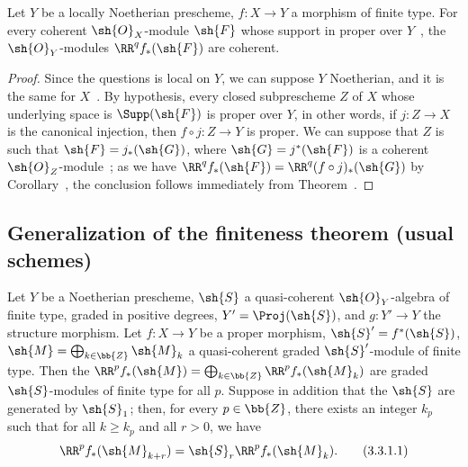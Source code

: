 \begin{corollary}[3.2.4]
\label{III.3.2.4}
Let $Y$ be a locally Noetherian prescheme, $f:X\to Y$ a morphism of finite type.
For every coherent $\sh{O}_X$-module $\sh{F}$ whose support in proper over $Y$~, the $\sh{O}_Y$-modules $\RR^q f_*(\sh{F})$ are coherent.
\end{corollary}

\begin{proof}
Since the questions is local on $Y$, we can suppose $Y$ Noetherian, and it is the same for $X$~.
By hypothesis, every closed subprescheme $Z$ of $X$ whose underlying space is $\Supp(\sh{F})$ is proper over $Y$, in other words, if $j:Z\to X$ is the canonical injection, then $f\circ j:Z\to Y$ is proper.
We can suppose that $Z$ is such that $\sh{F}=j_*(\sh{G})$, where $\sh{G}=j^*(\sh{F})$ is a coherent $\sh{O}_Z$-module~; as we have $\RR^q f_*(\sh{F})=\RR^q(f\circ j)_*(\sh{G})$ by Corollary~, the conclusion follows immediately from Theorem~.
\end{proof}

\subsection{Generalization of the finiteness theorem (usual schemes)}
\label{subsection:III.3.3}

\begin{proposition}[3.3.1]
\label{III.3.3.1}
Let $Y$ be a Noetherian prescheme, $\sh{S}$ a quasi-coherent $\sh{O}_Y$-algebra of finite type, graded in positive degrees, $Y'=\Proj(\sh{S})$, and $g:Y'\to Y$ the structure morphism.
Let $f:X\to Y$ be a proper morphism, $\sh{S}'=f^*(\sh{S})$, $\sh{M}=\bigoplus_{k\in\bb{Z}}\sh{M}_k$ a quasi-coherent graded $\sh{S}'$-module of finite type.
Then the $\RR^p f_*(\sh{M})=\bigoplus_{k\in\bb{Z}}\RR^p f_*(\sh{M}_k)$ are graded $\sh{S}$-modules of finite type for all $p$.
Suppose in addition that the $\sh{S}$ are generated by $\sh{S}_1$; then, for every $p\in\bb{Z}$, there exists an integer $k_p$ such that for all $k\geq k_p$ and all $r>0$, we have
\[
\label{III.3.3.1.1}
  \RR^p f_*(\sh{M}_{k+r})=\sh{S}_r\RR^p f_*(\sh{M}_k).
  \tag{3.3.1.1}
\] 
\end{proposition}

